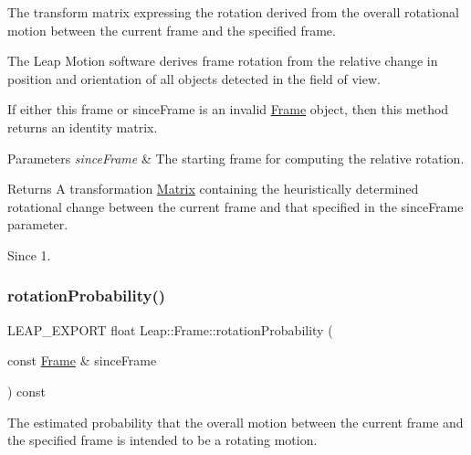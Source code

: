 The transform matrix expressing the rotation derived from the overall rotational motion between the current frame and the specified frame.


\begin{DoxyCodeInclude}
\end{DoxyCodeInclude}


The Leap Motion software derives frame rotation from the relative change in position and orientation of all objects detected in the field of view.

If either this frame or since\+Frame is an invalid \hyperlink{class_leap_1_1_frame}{Frame} object, then this method returns an identity matrix.


\begin{DoxyParams}{Parameters}
{\em since\+Frame} & The starting frame for computing the relative rotation. \\
\hline
\end{DoxyParams}
\begin{DoxyReturn}{Returns}
A transformation \hyperlink{struct_leap_1_1_matrix}{Matrix} containing the heuristically determined rotational change between the current frame and that specified in the since\+Frame parameter. 
\end{DoxyReturn}
\begin{DoxySince}{Since}
1. 
\end{DoxySince}
\mbox{\label{class_leap_1_1_frame_a8d0951680227a2c75bdccb60c12383b1}} 
\subsubsection{\texorpdfstring{rotation\+Probability()}{rotationProbability()}}
{\footnotesize\ttfamily L\+E\+A\+P\+\_\+\+E\+X\+P\+O\+RT float Leap\+::\+Frame\+::rotation\+Probability (\begin{DoxyParamCaption}\item[{const \hyperlink{class_leap_1_1_frame}{Frame} \&}]{since\+Frame }\end{DoxyParamCaption}) const}

The estimated probability that the overall motion between the current frame and the specified frame is intended to be a rotating motion.


\begin{DoxyCodeInclude}
\end{DoxyCodeInclude}


